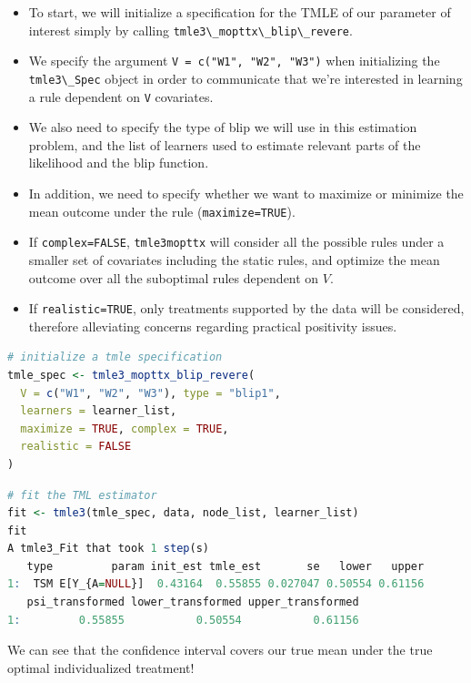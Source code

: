 \documentclass[
  12pt, krantz2,
]{book}
\newcommand{\passthrough}[1]{#1}
\theoremstyle{definition}
\theoremstyle{definition}
\theoremstyle{definition}
\newcommand{\1}{\mathbbm{1}}
\begin{document}
\begin{itemize}
\item
  To start, we will initialize a specification for the TMLE of our parameter of
  interest simply by calling \passthrough{\lstinline!tmle3\_mopttx\_blip\_revere!}.
\item
  We specify the argument \passthrough{\lstinline!V = c("W1", "W2", "W3")!} when initializing the
  \passthrough{\lstinline!tmle3\_Spec!} object in order to communicate that we're interested in learning
  a rule dependent on \passthrough{\lstinline!V!} covariates.
\item
  We also need to specify the type of blip we will use in this estimation
  problem, and the list of learners used to estimate relevant parts of the
  likelihood and the blip function.
\item
  In addition, we need to specify whether we want to maximize or minimize the
  mean outcome under the rule (\passthrough{\lstinline!maximize=TRUE!}).
\item
  If \passthrough{\lstinline!complex=FALSE!}, \passthrough{\lstinline!tmle3mopttx!} will consider all the possible rules under a
  smaller set of covariates including the static rules, and optimize the mean
  outcome over all the suboptimal rules dependent on \(V\).
\item
  If \passthrough{\lstinline!realistic=TRUE!}, only treatments supported by the data will be considered,
  therefore alleviating concerns regarding practical positivity issues.
\end{itemize}

\begin{lstlisting}[language=R]
# initialize a tmle specification
tmle_spec <- tmle3_mopttx_blip_revere(
  V = c("W1", "W2", "W3"), type = "blip1",
  learners = learner_list,
  maximize = TRUE, complex = TRUE,
  realistic = FALSE
)
\end{lstlisting}

\begin{lstlisting}[language=R]
# fit the TML estimator
fit <- tmle3(tmle_spec, data, node_list, learner_list)
fit
A tmle3_Fit that took 1 step(s)
   type         param init_est tmle_est       se   lower   upper
1:  TSM E[Y_{A=NULL}]  0.43164  0.55855 0.027047 0.50554 0.61156
   psi_transformed lower_transformed upper_transformed
1:         0.55855           0.50554           0.61156
\end{lstlisting}

We can see that the confidence interval covers our true mean under the true optimal
individualized treatment!
\end{document}
